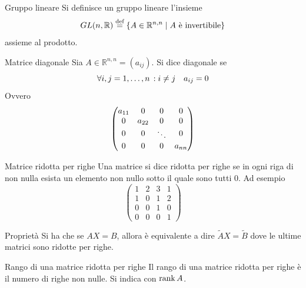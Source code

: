 \begin{SubDef}{Gruppo lineare}
  Si definisce un gruppo lineare l'insieme
  \begin{equation*}
    GL(n,\mathbb{R})\bydef \left\{ A\in\mathbb{R}^{n,n}\Setsuchthat A\text{ è
    invertibile} \right\}
  \end{equation*}
  assieme al prodotto.
\end{SubDef}

\begin{Def}{Matrice diagonale}
  Sia $A\in\mathbb{R}^{n,n} = (a_{ij})$. Si dice diagonale se
  \begin{equation*}
    \forall i,j = 1,\ldots,n\,: i\neq j\quad a_{ij} = 0
  \end{equation*}
  Ovvero
  \begin{equation*}
    \mqty(\dmat[0]{a_{11}, a_{22}, \ddots, a_{nn}})
  \end{equation*}
\end{Def}

\begin{Def}{Matrice ridotta per righe}
  Una matrice si dice ridotta per righe se in ogni riga di non nulla esista un elemento
  non nullo sotto il quale sono tutti $0$. Ad esempio
  \begin{equation*}
    \begin{pmatrix}
      1 & 2 & 3 & 1\\
      1 & 0 & 1 & 2\\
      0 & 0 & 1 & 0\\
      0 & 0 & 0 & 1
    \end{pmatrix}
  \end{equation*}
\end{Def}

\begin{SubDef}{Proprietà}
  Si ha che se $AX=B$, allora è equivalente a dire $\widetilde{A}X=\widetilde{B}$ dove
  le ultime matrici sono ridotte per righe.
\end{SubDef}

\begin{Def}{Rango di una matrice ridotta per righe}
  Il rango di una matrice ridotta per righe è il numero di righe non nulle. Si indica
  con $\rank A$.
\end{Def}

